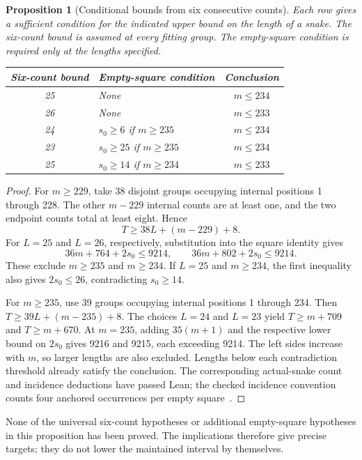 \documentclass[11pt,a4paper]{article}
\newtheorem{proposition}[theorem]{Proposition}
\theoremstyle{definition}
\theoremstyle{remark}
\begin{document}
\begin{proposition}[Conditional bounds from six consecutive counts]\label{prop:six-direct}
Each row gives a sufficient condition for the indicated upper bound on the
length of a snake. The six-count bound is assumed at every fitting group.
The empty-square condition is required only at the lengths specified.
\begin{center}
\begin{tabular}{c l c}
\toprule
Six-count bound & Empty-square condition & Conclusion\\\midrule
25 & None & $m\le234$\\
26 & None & $m\le233$\\
24 & $s_0\ge6$ if $m\ge235$ & $m\le234$\\
23 & $s_0\ge25$ if $m\ge235$ & $m\le234$\\
25 & $s_0\ge14$ if $m\ge234$ & $m\le233$\\\bottomrule
\end{tabular}
\end{center}
\end{proposition}
\begin{proof}
For $m\ge229$, take 38 disjoint groups occupying internal positions 1 through
228. The other $m-229$ internal counts are at least one, and the two endpoint
counts total at least eight. Hence
\[
T\ge38L+(m-229)+8.
\]
For $L=25$ and $L=26$, respectively, substitution into the square identity gives
\[
36m+764+2s_0\le9214,\qquad36m+802+2s_0\le9214.
\]
These exclude $m\ge235$ and $m\ge234$. If $L=25$ and $m\ge234$, the first
inequality also gives $2s_0\le26$, contradicting $s_0\ge14$.

For $m\ge235$, use 39 groups occupying internal positions 1 through 234.
Then $T\ge39L+(m-235)+8$. The choices $L=24$ and $L=23$ yield
$T\ge m+709$ and $T\ge m+670$. At $m=235$, adding $35(m+1)$ and the
respective lower bound on $2s_0$ gives 9216 and 9215, each exceeding 9214.
The left sides increase with $m$, so larger lengths are also excluded.
Lengths below each contradiction threshold already satisfy the conclusion.
The corresponding actual-snake count and incidence deductions have passed
Lean; the checked incidence convention counts four anchored occurrences
per empty square~\cite{uniformsixarchive,criticalsixarchive}.
\end{proof}
None of the universal six-count hypotheses or additional empty-square
hypotheses in this proposition has been proved. The implications therefore
give precise targets; they do not lower the maintained interval by themselves.
\end{document}
